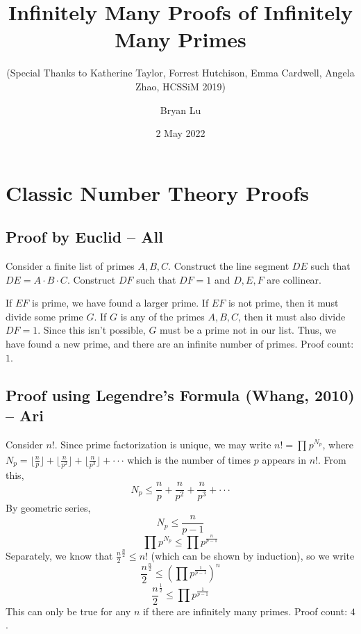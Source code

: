 \documentclass[12pt]{scrartcl}
\title{Infinitely Many Proofs of Infinitely Many Primes}
\subtitle{(Special Thanks to Katherine Taylor, Forrest Hutchison, Emma Cardwell, Angela Zhao, HCSSiM 2019)}
\author{Bryan Lu}
\date{2 May 2022} %
\begin{document}
\maketitle

\section{Classic Number Theory Proofs}
\subsection*{Proof by Euclid -- All}
Consider a finite list of primes $A,B,C$. Construct the line segment $DE$ such that $DE=A\cdot{B}\cdot{C}$. Construct $DF$ such that $DF=1$ and $D,E,F$ are collinear.
\begin{center}
\end{center}
If $EF$ is prime, we have found a larger prime. If $EF$ is not prime, then it must divide some prime $G$. If $G$ is any of the primes $A,B,C$, then it must also divide $DF=1$. Since this isn't possible, $G$ must be a prime not in our list. Thus, we have found a new prime, and there are an infinite number of primes. Proof count: $1$.

\subsection*{Proof using Legendre's Formula (Whang, 2010) -- Ari}
Consider $n!$. Since prime factorization is unique, we may write $n! = \prod_{}{p^{N_p}}$, where $N_p = \lfloor \frac{n}{p} \rfloor + \lfloor \frac{n}{p^2} \rfloor + \lfloor \frac{n}{p^3} \rfloor + \cdot \cdot \cdot$ which is the number of times $p$ appears in $n!$. From this,
$$N_p \leq \frac{n}{p} + \frac{n}{p^2} + \frac{n}{p^3} + \cdot \cdot \cdot$$
By geometric series, $$ N_p \leq \frac{n}{p-1}$$
$$\prod{}{p^{N_p}} \leq \prod{}{p^{\frac{n}{p-1}}}$$
Separately, we know that $\frac{n}{2}^{\frac{n}{2}} \leq n!$ (which can be shown by induction), so we write $$\frac{n}{2}^{\frac{n}{2}} \leq (\prod{}{p^{\frac{1}{p-1}}})^n$$
$$\frac{n}{2}^{\frac{1}{2}} \leq \prod{}{p^{\frac{1}{p-1}}}$$
This can only be true for any $n$ if there are infinitely many primes. Proof count: $4$.
\end{document}
